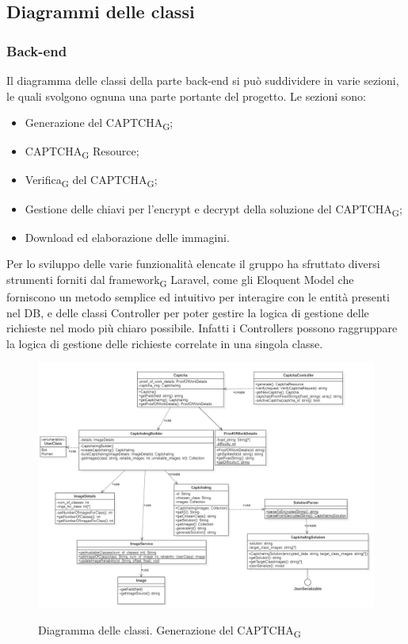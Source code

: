 \subsection{Diagrammi delle classi}

\subsubsection{Back-end}

Il diagramma delle classi della parte back-end si può suddividere in varie sezioni, le quali svolgono ognuna una parte portante del progetto. Le sezioni sono:
\begin{itemize}
    \item Generazione del CAPTCHA\textsubscript{G};
    \item CAPTCHA\textsubscript{G} Resource;
    \item Verifica\textsubscript{G} del CAPTCHA\textsubscript{G};
    \item Gestione delle chiavi per l'encrypt e decrypt della soluzione del CAPTCHA\textsubscript{G};
    \item Download ed elaborazione delle immagini.
\end{itemize}

Per lo sviluppo delle varie funzionalità elencate il gruppo ha sfruttato diversi strumenti forniti dal framework\textsubscript{G} Laravel, 
come gli Eloquent Model che forniscono un metodo semplice ed intuitivo per interagire con le entità presenti nel DB, e delle classi 
Controller per poter gestire la logica di gestione delle richieste nel modo più chiaro possibile. Infatti i Controllers possono 
raggruppare la logica di gestione delle richieste correlate in una singola classe.


\begin{figure}[H]
    \centering
    \includegraphics[scale = 0.45]{img/generate.png}\\
    \caption{Diagramma delle classi. Generazione del CAPTCHA\textsubscript{G}}
\end{figure}
\newpage

